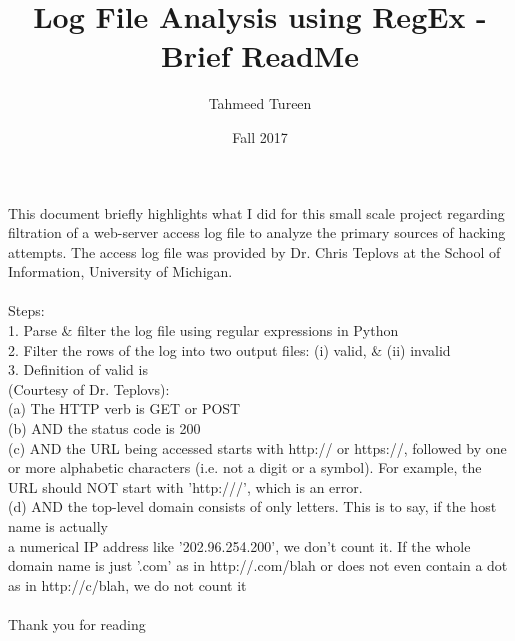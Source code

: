 \documentclass[11pt]{article}
\begin{document}
\title{Log File Analysis using RegEx - Brief ReadMe}
\author{Tahmeed Tureen}
\date{Fall 2017}
\maketitle

This document briefly highlights what I did for this small scale project regarding filtration of a web-server access log file to analyze the primary sources of hacking attempts. The access log file was provided by Dr. Chris Teplovs at the School of Information, University of Michigan. \\~\\



Steps:\\
1. Parse \& filter the log file using regular expressions in Python\\
2. Filter the rows of the log into two output files: (i) valid, \& (ii) invalid\\
3. Definition of valid is \\

(Courtesy of Dr. Teplovs):\\
(a) The HTTP verb is GET or POST\\
(b) AND the status code is 200\\
(c) AND the URL being accessed starts with http:// or https://, followed by one or more alphabetic characters (i.e. not a digit or a symbol).  For example, the URL should NOT start with 'http:///', which is an error.\\
(d) AND the top-level domain consists of only letters. This is to say, if the host name is actually\\
a numerical IP address like '202.96.254.200', we don’t count it. If the whole domain name is just '.com' as in http://.com/blah or does not even contain a dot as in http://c/blah, we do not count it\\~\\



Thank you for reading\\
\end{document}
